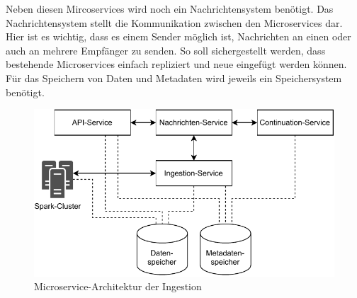 Neben diesen Mircoservices wird noch ein Nachrichtensystem benötigt.
Das Nachrichtensystem stellt die Kommunikation zwischen den Microservices dar.
Hier ist es wichtig, dass es einem Sender möglich ist, Nachrichten an einen oder auch an mehrere Empfänger zu senden.
So soll sichergestellt werden, dass bestehende Microservices einfach repliziert und neue eingefügt werden können.
Für das Speichern von Daten und Metadaten wird jeweils ein Speichersystem benötigt.

\begin{figure}
    \centering
    \includegraphics{Grafiken/Entwicklung-System-Architektur.pdf}
    \caption{Microservice-Architektur der Ingestion}
    \label{fig:system-architektur}
\end{figure}
